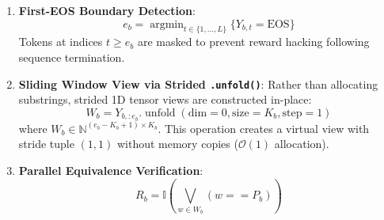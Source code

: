 \documentclass[10pt,twocolumn,letterpaper]{article}
\begin{document}
\begin{enumerate}
    \item \textbf{First-EOS Boundary Detection}:
    \begin{equation}
        e_b = \operatorname{argmin}_{t \in \{1,\dots,L\}} \{ Y_{b,t} = \text{EOS} \}
    \end{equation}
    Tokens at indices $t \ge e_b$ are masked to prevent reward hacking following sequence termination.
    \item \textbf{Sliding Window View via Strided \texttt{.unfold()}}:
    Rather than allocating substrings, strided 1D tensor views are constructed in-place:
    \begin{equation}
        W_b = Y_{b, :e_b}.\operatorname{unfold}(\text{dim}=0, \text{size}=K_b, \text{step}=1)
    \end{equation}
    where $W_b \in \mathbb{N}^{(e_b - K_b + 1) \times K_b}$. This operation creates a virtual view with stride tuple $(1, 1)$ without memory copies ($\mathcal{O}(1)$ allocation).
    \item \textbf{Parallel Equivalence Verification}:
    \begin{equation}
        R_b = \mathbb{I}\left( \bigvee_{w \in W_b} (w == P_b) \right)
    \end{equation}
\end{enumerate}
\end{document}
